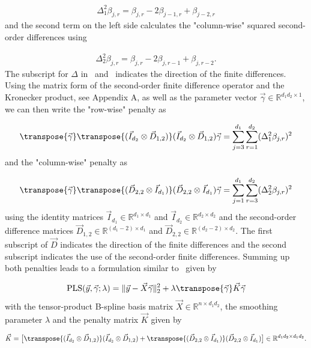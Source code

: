 \begin{align} \label{eq:row-wise-diff-operator}
	\Delta_1^2 \beta_{j,r} = \beta_{j,r} - 2\beta_{j-1,r} + \beta_{j-2,r} 
\end{align}
%
and the second term on the left side calculates the "column-wise" squared second-order differences using

\begin{align} \label{eq:col-wise-diff-operator}
	\Delta_2^2 \beta_{j,r} = \beta_{j,r} -2\beta_{j,r-1} + \beta_{j,r-2}.
\end{align}
%
The subscript for $\Delta$ in~ and~ indicates the direction of the finite differences. Using the matrix form of the second-order finite difference operator and the Kronecker product, see Appendix A, as well as the parameter vector $\vec{\gamma} \in \mathbb{R}^{d_1 d_2 \times 1}$, we can then write the "row-wise" penalty as

\begin{align}
	\transpose{\vec{\gamma}} \transpose{(\vec{I}_{d_2} \otimes \vec{D}_{1,2})} (\vec{I}_{d_2} \otimes \vec{D}_{1,2}) \vec{\gamma} = \sum_{j=3}^{d_1} \sum_{r=1}^{d_2} (\Delta_1^2 \beta_{j,r})^2
\end{align}
%
and the "column-wise" penalty as

\begin{align}
	\transpose{\vec{\gamma}} \transpose{(\vec{D}_{2,2} \otimes \vec{I}_{d_1})} (\vec{D}_{2,2} \otimes \vec{I}_{d_1}) \vec{\gamma} = \sum_{j=1}^{d_1} \sum_{r=3}^{d_2} (\Delta_2^2 \beta_{j,r})^2
\end{align}
%
using the identity matrices $\vec{I}_{d_1} \in \mathbb{R}^{d_1 \times d_1}$ and $\vec{I}_{d_2} \in \mathbb{R}^{d_2 \times d_2}$ and the second-order difference matrices $\vec{D}_{1,2} \in \mathbb{R}^{(d_1 - 2) \times d_1}$ and $\vec{D}_{2,2} \in \mathbb{R}^{(d_2 - 2) \times d_2}$. The first subscript of $\vec{D}$ indicates the direction of the finite differences and the second subscript indicates the use of the second-order finite differences. Summing up both penalties leads to a formulation similar to~ given by

\begin{align} \label{eq:TP-P-spline-final-OF}
	\text{PLS}(\vec{y}, \vec{\gamma}; \lambda) = \lVert \vec{y} - \vec{X} \vec{\gamma} \rVert_2^2 + \lambda \transpose{\vec{\gamma}} \vec{K} \vec{\gamma}
\end{align}
%
with the tensor-product B-spline basis matrix $\vec{X} \in \mathbb{R}^{n \times d_1 d_2}$, the smoothing parameter $\lambda$ and the penalty matrix $\vec{K}$ given by

\begin{align}
	\vec{K} = \big[ \transpose{(\vec{I}_{d_2} \otimes \vec{D}_{1,2})} (\vec{I}_{d_2} \otimes \vec{D}_{1,2}) + \transpose{(\vec{D}_{2,2} \otimes \vec{I}_{d_1})} (\vec{D}_{2,2} \otimes \vec{I}_{d_1}) \big] \in \mathbb{R}^{d_1 d_2 \times d_1 d_2}.
\end{align}
